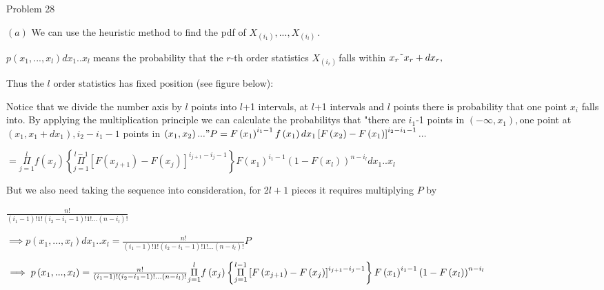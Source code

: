 \documentclass{article}
\begin{document}
\bigskip Problem 28

$\left( a\right) $ We can use the heuristic method to find the pdf of $%
X_{\left( i_{1}\right) },...,X_{\left( i_{l}\right) \ }.$

$p\left( x_{1},...,x_{l}\right) dx_{1}..x_{l}$ means the probability that
the $r$-th order statistics $X_{\left( i_{r}\right) \ }$falls within $x_{r}%
\symbol{126}x_{r}+dx_{r},$

Thus the $l$ order statistics has fixed position (see figure below)$:$


Notice that we divide the number axis by $l$ points into $l$+1 intervals, at 
$l$+1 intervals and $l$ points there is probability that one point $x_{i}$
falls into. By applying the multiplication principle we can calculate the
probabilitys that "there are $i_{1}$-1 points in $\left( -\infty
,x_{1}\right) ,$one point at $\left( x_{1},x_{1}+dx_{1}\right) ,i_{2}-i_{1}-1
$ points in $\left( x_{1},x_{2}\right) ..."P=F\left( x_{1}\right)
^{i_{1}-1}f\left( x_{1}\right) dx_{1}\left[ F\left( x_{2}\right) -F\left(
x_{1}\right) \right] ^{i_{2}-i_{1}-1}...$

$=\overset{l}{\underset{j=1}{\Pi }}f\left( x_{j}\right) \left\{ \overset{l-1}%
{\underset{j=1}{\Pi }}\left[ F\left( x_{j+1}\right) -F\left( x_{j}\right) %
\right] ^{i_{j+1}-i_{j}-1}\right\} F\left( x_{1}\right) ^{i_{1}-1}\left(
1-F\left( x_{l}\right) \right) ^{n-i_{l}}dx_{1}..x_{l}$

But we also need taking the sequence into consideration, for 2$l+1$ pieces
it requires multiplying $P$ by

$\frac{n!}{\left( i_{1}-1\right) !1!\left( i_{2}-i_{1}-1\right) !1!...\left(
n-i_{l}\right) !}$

$\implies p\left( x_{1},...,x_{l}\right) dx_{1}..x_{l}=\frac{n!}{\left(
i_{1}-1\right) !1!\left( i_{2}-i_{1}-1\right) !1!...\left( n-i_{l}\right) !}P
$

$\implies p\left( x_{1},...,x_{l}\right) =\frac{n!}{\left( i_{1}-1\right)
!\left( i_{2}-i_{1}-1\right) !...\left( n-i_{l}\right) !}\overset{l}{%
\underset{j=1}{\Pi }}f\left( x_{j}\right) \left\{ \overset{l-1}{\underset{j=1%
}{\Pi }}\left[ F\left( x_{j+1}\right) -F\left( x_{j}\right) \right]
^{i_{j+1}-i_{j}-1}\right\} F\left( x_{1}\right) ^{i_{1}-1}\left( 1-F\left(
x_{l}\right) \right) ^{n-i_{l}}$
\end{document}
